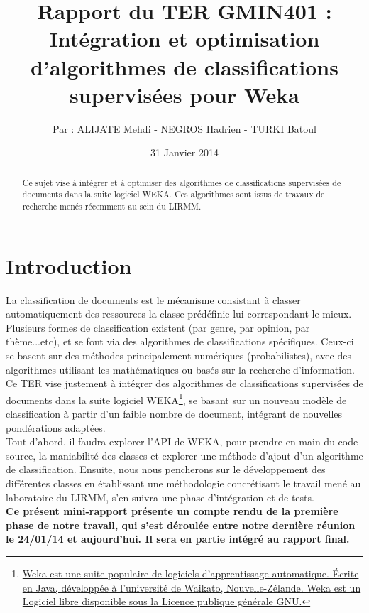 \documentclass{article}
\title{Rapport du TER GMIN401 :\\ \textbf{Intégration et optimisation d’algorithmes de classifications supervisées pour Weka}}
\author{Par : ALIJATE Mehdi - NEGROS Hadrien - TURKI Batoul}
\date{31 Janvier 2014}
\begin{document}
\maketitle
\tableofcontents

\begin{abstract}
	
Ce sujet vise à intégrer et à optimiser des algorithmes de classifications supervisées de documents dans la suite logiciel WEKA. Ces algorithmes sont issus de travaux de recherche menés récemment au sein du LIRMM.
\end{abstract}

\newpage 
\section{Introduction}\label{sec:intro}

La classification de documents est le mécanisme consistant à classer automatiquement des ressources la classe prédéfinie lui correspondant le mieux.\\
Plusieurs formes de classification existent (par genre, par opinion, par thème...etc), et se font via des algorithmes de classifications spécifiques. Ceux-ci se basent sur des méthodes principalement numériques (probabilistes), avec des algorithmes utilisant les mathématiques ou basés sur la recherche d'information. \\
Ce TER vise justement à intégrer des algorithmes de classifications supervisées de documents dans la suite logiciel WEKA\footnote{\href{http://www.cs.waikato.ac.nz/~ml/weka/}{Weka est une suite populaire de logiciels d'apprentissage automatique. Écrite en Java, développée à l'université de Waikato, Nouvelle-Zélande. Weka est un Logiciel libre disponible sous la Licence publique générale GNU.}}, se basant sur un nouveau modèle de classification à partir d'un faible nombre de document, intégrant de nouvelles pondérations adaptées.\\
Tout d'abord, il faudra explorer l'API de WEKA, pour prendre en main du code source, la maniabilité des classes et explorer une méthode d'ajout d'un algorithme de classification. Ensuite, nous nous pencherons sur le développement des différentes classes en établissant une méthodologie concrétisant le travail mené au laboratoire du LIRMM, s'en suivra une phase d'intégration et de tests.\\


\textbf{{\normalsize Ce présent mini-rapport présente un compte rendu de la première phase de notre travail, qui s'est déroulée entre notre dernière réunion le 24/01/14 et aujourd'hui. Il sera en partie intégré au rapport final.}}
\end{document}
